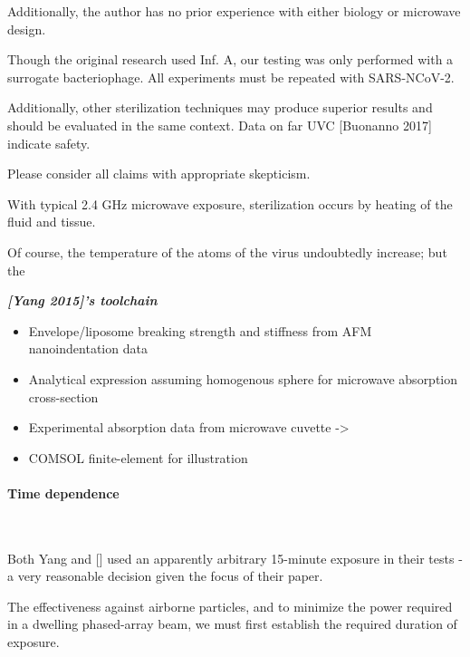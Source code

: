 \documentclass[fleqn,10pt]{article}
\begin{document}
Additionally, the author has no prior experience with either biology or microwave design. 

Though the original research used Inf. A, our testing was only performed with a surrogate bacteriophage. All experiments must be repeated with SARS-NCoV-2.

Additionally, other sterilization techniques may produce superior results and should be evaluated in the same context. Data on far UVC [Buonanno 2017] indicate safety.

Please consider all claims with appropriate skepticism.


\begin{multicols}{1}


With typical 2.4 GHz microwave exposure, sterilization occurs by heating of the fluid and tissue.

Of course, the temperature of the atoms of the virus undoubtedly increase; but the 

\begin{toolchain}
	{\it \bf [Yang 2015]'s toolchain}
	\begin{itemize}
	\item Envelope/liposome breaking strength and stiffness from AFM nanoindentation data
	\item Analytical expression assuming homogenous sphere for microwave absorption cross-section
	\item Experimental absorption data from microwave cuvette -> 
	\item COMSOL finite-element for illustration
	\end{itemize}
\end{toolchain}

\end{multicols}






\clearpage
\paragraph{\textbf{Time dependence}}\


Both Yang and [] used an apparently arbitrary 15-minute exposure in their tests - a very reasonable decision given the focus of their paper. 

The effectiveness against airborne particles, and to minimize the power required in a dwelling phased-array beam, we must first establish the required duration of exposure.
\end{document}
